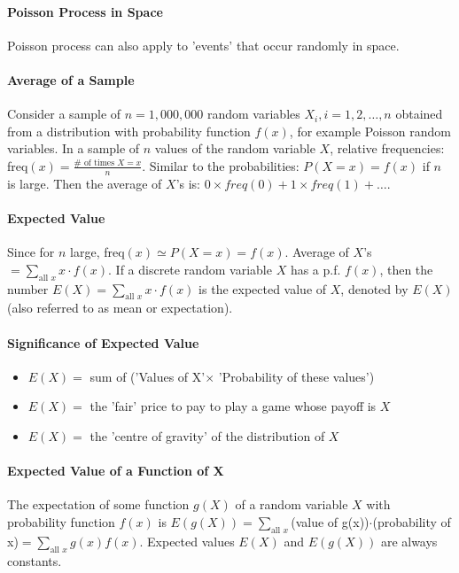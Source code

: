 \documentclass[10pt,letter]{article}
\begin{document}
\paragraph{Poisson Process in Space} Poisson process can also apply to 'events' that occur randomly in space. 

\paragraph{Average of a Sample} Consider a sample of $n=1,000,000$ random variables $X_i,i=1,2,\ldots,n$ obtained from a distribution with probability function $f(x)$, for example Poisson random variables. In a sample of $n$ values of the random variable $X$, relative frequencies: freq$(x)=\frac{\#\text{ of times }X = x}{n}$. Similar to the probabilities: $P(X=x)=f(x)$ if $n$ is large. Then the average of $X$'s is: $0\times freq(0) + 1\times freq(1)+\ldots$. 

\paragraph{Expected Value} Since for $n$ large, freq$(x)\simeq P(X=x)=f(x)$. Average of $X$'s $= \sum_{\text{all }x}x\cdot f(x)$. If a discrete random variable $X$ has a p.f. $f(x)$, then the number $E(X)=\sum_{\text{all }x}x\cdot f(x)$ is the expected value of $X$, denoted by $E(X)$ (also referred to as mean or expectation). 

\paragraph{Significance of Expected Value} \begin{itemize}
    \item $E(X)= $ sum of ('Values of X'$\times$ 'Probability of these values')
    \item $E(X)= $ the 'fair' price to pay to play a game whose payoff is $X$ 
    \item $E(X)= $ the 'centre of gravity' of the distribution of $X$ 
\end{itemize}

\paragraph{Expected Value of a Function of X} The expectation of some function $g(X)$ of a random variable $X$ with probability function $f(x)$ is $E(g(X)) = \sum_{\text{all }x}$(value of g(x))$\cdot$(probability of x)$=\sum_{\text{all }x}g(x)f(x)$. Expected values $E(X)$ and $E(g(X))$ are always constants. 
\end{document}
